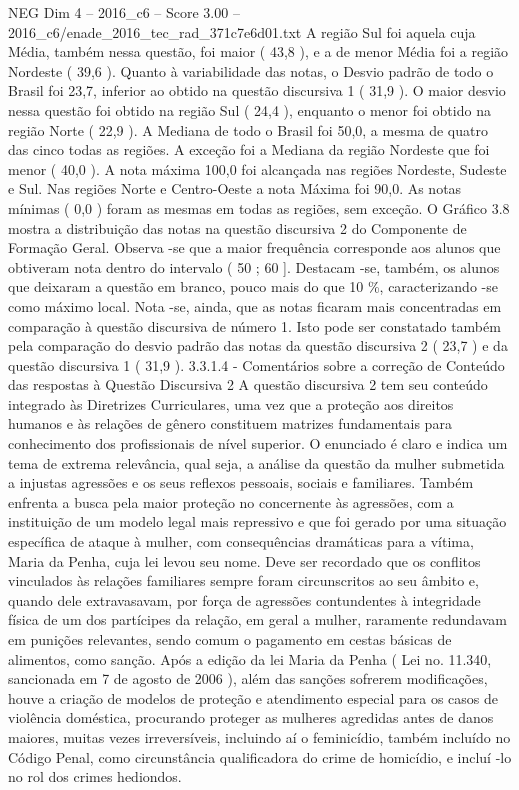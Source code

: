 \begin{textsample}{NEG Dim 4 – 2016\_c6 – Score 3.00 – 2016\_c6/enade\_2016\_tec\_rad\_371c7e6d01.txt}
A região Sul foi aquela cuja Média, também nessa questão, foi maior ( 43,8 ), e a de menor Média foi a região Nordeste ( 39,6 ).
Quanto à variabilidade das notas, o Desvio padrão de todo o Brasil foi 23,7, inferior ao obtido na questão discursiva 1 ( 31,9 ).
O maior desvio nessa questão foi obtido na região Sul ( 24,4 ), enquanto o menor foi obtido na região Norte ( 22,9 ).
A Mediana de todo o Brasil foi 50,0, a mesma de quatro das cinco todas as regiões.
A exceção foi a Mediana da região Nordeste que foi menor ( 40,0 ).
A nota máxima 100,0 foi alcançada nas regiões Nordeste, Sudeste e Sul.
Nas regiões Norte e Centro-Oeste a nota Máxima foi 90,0.
As notas mínimas ( 0,0 ) foram as mesmas em todas as regiões, sem exceção.
O Gráfico 3.8 mostra a distribuição das notas na questão discursiva 2 do Componente de Formação Geral.
Observa -se que a maior frequência corresponde aos alunos que obtiveram nota dentro do intervalo ( 50 ; 60 ].
Destacam -se, também, os alunos que deixaram a questão em branco, pouco mais do que 10 \%, caracterizando -se como máximo local.
Nota -se, ainda, que as notas ficaram mais concentradas em comparação à questão discursiva de número 1.
Isto pode ser constatado também pela comparação do desvio padrão das notas da questão discursiva 2 ( 23,7 ) e da questão discursiva 1 ( 31,9 ). 3.3.1.4 - Comentários sobre a correção de Conteúdo das respostas à Questão Discursiva 2 A questão discursiva 2 tem seu conteúdo integrado às Diretrizes Curriculares, uma vez que a proteção aos direitos humanos e às relações de gênero constituem matrizes fundamentais para conhecimento dos profissionais de nível superior.
O enunciado é claro e indica um tema de extrema relevância, qual seja, a análise da questão da mulher submetida a injustas agressões e os seus reflexos pessoais, sociais e familiares.
Também enfrenta a busca pela maior proteção no concernente às agressões, com a instituição de um modelo legal mais repressivo e que foi gerado por uma situação específica de ataque à mulher, com consequências dramáticas para a vítima, Maria da Penha, cuja lei levou seu nome.
Deve ser recordado que os conflitos vinculados às relações familiares sempre foram circunscritos ao seu âmbito e, quando dele extravasavam, por força de agressões contundentes à integridade física de um dos partícipes da relação, em geral a mulher, raramente redundavam em punições relevantes, sendo comum o pagamento em cestas básicas de alimentos, como sanção.
Após a edição da lei Maria da Penha ( Lei no. 11.340, sancionada em 7 de agosto de 2006 ), além das sanções sofrerem modificações, houve a criação de modelos de proteção e atendimento especial para os casos de violência doméstica, procurando proteger as mulheres agredidas antes de danos maiores, muitas vezes irreversíveis, incluindo aí o feminicídio, também incluído no Código Penal, como circunstância qualificadora do crime de homicídio, e incluí -lo no rol dos crimes hediondos.

\end{textsample}
